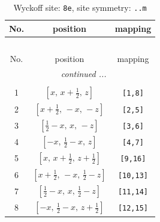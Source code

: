 \documentclass[fleqn,8pt]{jsarticle}
\begin{document}
\renewcommand{\arraystretch}{1.2}
\begin{longtable}{ccc}
\caption{Wyckoff site: {\tt 8e}, site symmetry: {\tt ..m}}
 \\
 \hline \hline
No. & position & mapping \\ \hline \endfirsthead

\multicolumn{2}{l}{\tablename\ \thetable{}} \\
 \hline \hline
No. & position & mapping \\ \hline \endhead

 \hline \hline
\multicolumn{2}{r}{\footnotesize\it continued ...} \\ \endfoot

 \hline \hline
\multicolumn{2}{r}{} \\ \endlastfoot

1 & $\left[ x,\, x + \frac{1}{2},\, z \right]$ & {\tt [1,8]} \\ \hline
2 & $\left[ x + \frac{1}{2},\, - x,\, - z \right]$ & {\tt [2,5]} \\ \hline
3 & $\left[ \frac{1}{2} - x,\, x,\, - z \right]$ & {\tt [3,6]} \\ \hline
4 & $\left[ - x,\, \frac{1}{2} - x,\, z \right]$ & {\tt [4,7]} \\ \hline
5 & $\left[ x,\, x + \frac{1}{2},\, z + \frac{1}{2} \right]$ & {\tt [9,16]} \\ \hline
6 & $\left[ x + \frac{1}{2},\, - x,\, \frac{1}{2} - z \right]$ & {\tt [10,13]} \\ \hline
7 & $\left[ \frac{1}{2} - x,\, x,\, \frac{1}{2} - z \right]$ & {\tt [11,14]} \\ \hline
8 & $\left[ - x,\, \frac{1}{2} - x,\, z + \frac{1}{2} \right]$ & {\tt [12,15]} \\
\end{longtable}
\renewcommand{\arraystretch}{1.2}
\end{document}
